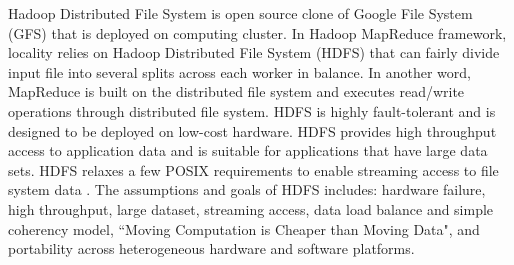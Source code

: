 
Hadoop Distributed File System \cite{HDFS} is open source clone of Google File System (GFS) \cite{ghemawat2003google} that is deployed on computing cluster. In Hadoop MapReduce framework, locality relies on Hadoop Distributed File System (HDFS) that can fairly divide input file into several splits across each worker in balance. In another word, MapReduce is built on the distributed file system and executes read/write operations through distributed file system. HDFS is highly fault-tolerant and is designed to be deployed on low-cost hardware. HDFS provides high throughput access to application data and is suitable for applications that have large data sets. HDFS relaxes a few POSIX requirements to enable streaming access to file system data \cite{HDFS}. The assumptions and goals of HDFS includes: hardware failure, high throughput, large dataset, streaming access, data load balance and simple coherency model, ``Moving Computation is Cheaper than Moving Data", and portability across heterogeneous hardware and software platforms. 


